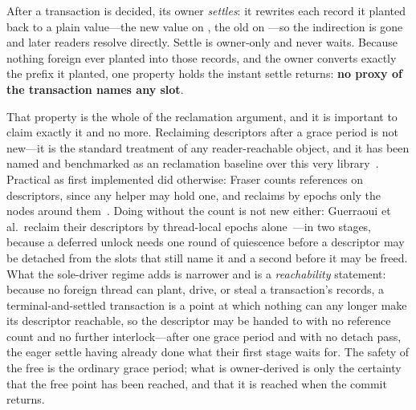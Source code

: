 \documentclass[11pt]{article}
\begin{document}
After a transaction is decided, its owner \emph{settles}: it rewrites each record
it planted back to a plain value---the new value on \SUCCEEDED, the old on
\FAILED---so the indirection is gone and later readers resolve directly. Settle
is owner-only and never waits. Because nothing foreign ever planted into those
records, and the owner converts exactly the prefix it planted, one property holds
the instant settle returns: \textbf{no proxy of the transaction names any slot}.

That property is the whole of the reclamation argument, and it is important to
claim exactly it and no more. Reclaiming descriptors after a grace period is not
new---it is the standard \rcu treatment of any reader-reachable object, and it
has been named and benchmarked as an \mcas reclamation baseline over this very
library~\citep{arbelraviv2017descriptors}. Practical \mcas as first implemented
did otherwise: Fraser counts references on descriptors, since any helper may
hold one, and reclaims by epochs only the nodes around
them~\citep{fraser2004lockfreedom}. Doing without the count is not new either:
Guerraoui et al.\ reclaim their descriptors by thread-local epochs
alone~\citep{guerraoui2020mcas}---in two stages, because a deferred unlock needs
one round of quiescence before a descriptor may be detached from the slots that
still name it and a second before it may be freed. What the sole-driver regime
adds is
narrower and is a \emph{reachability} statement: because no foreign thread can
plant, drive, or steal a transaction's records, a terminal-and-settled
transaction is a point at which nothing can any longer make its descriptor
reachable, so the descriptor may be handed to  with no
reference count and no further interlock---after one grace period and with no
detach pass, the eager settle having already done what their first stage waits
for. The safety of the free is the ordinary
\rcu grace period; what is owner-derived is only the certainty that the free
point has been reached, and that it is reached when the commit returns.

\end{document}

